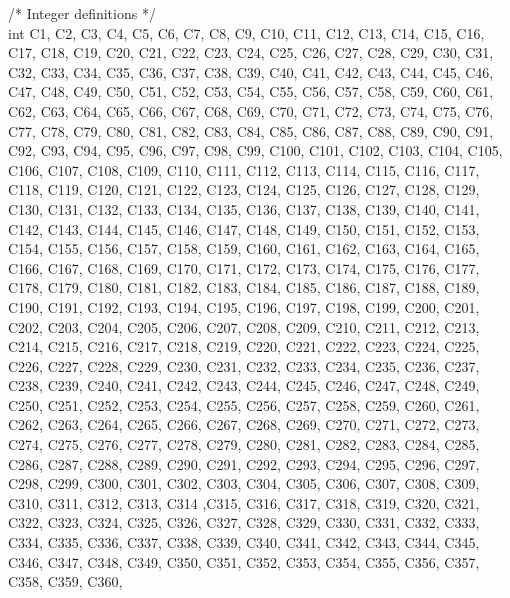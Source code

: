 /* Integer definitions */ \\
int C1, C2, C3, C4, C5, C6, C7, C8, C9, C10, C11, C12, C13, C14, C15, C16, C17, C18, C19, C20, C21, C22, C23, C24, C25, C26, C27, C28, C29, C30, C31, C32, C33, C34, C35, C36, C37, C38, C39, C40, C41, C42, C43, C44, C45, C46, C47, C48, C49, C50, C51, C52, C53, C54, C55, C56, C57, C58, C59, C60, C61, C62, C63, C64, C65, C66, C67, C68, C69, C70, C71, C72, C73, C74, C75, C76, C77, C78, C79, C80, C81, C82, C83, C84, C85, C86, C87, C88, C89, C90, C91, C92, C93, C94, C95, C96, C97, C98, C99, C100, C101, C102, C103, C104, C105, C106, C107, C108, C109, C110, C111, C112, C113, C114, C115, C116, C117, C118, C119, C120, C121, C122, C123, C124, C125, C126, C127, C128, C129, C130, C131, C132, C133, C134, C135, C136, C137, C138, C139, C140, C141, C142, C143, C144, C145, C146, C147, C148, C149, C150, C151, C152, C153, C154, C155, C156, C157, C158, C159, C160, C161, C162, C163, C164, C165, C166, C167, C168, C169, C170, C171, C172, C173, C174, C175, C176, C177, C178, C179, C180, C181, C182, C183, C184, C185, C186, C187, C188, C189, C190, C191, C192, C193, C194, C195, C196, C197, C198, C199, C200, C201, C202, C203, C204, C205, C206, C207, C208, C209, C210, C211, C212, C213, C214, C215, C216, C217, C218, C219, C220, C221, C222, C223, C224, C225, C226, C227, C228, C229, C230, C231, C232, C233, C234, C235, C236, C237, C238, C239, C240, C241, C242, C243, C244, C245, C246, C247, C248, C249, C250, C251, C252, C253, C254, C255, C256, C257, C258, C259, C260, C261, C262, C263, C264, C265, C266, C267, C268, C269, C270, C271, C272, C273, C274, C275, C276, C277, C278, C279, C280, C281, C282, C283, C284, C285, C286, C287, C288, C289, C290, C291, C292, C293, C294, C295, C296, C297, C298, C299, C300, C301, C302, C303, C304, C305, C306, C307, C308, C309, C310, C311, C312, C313, C314 ,C315, C316, C317, C318, C319, C320, C321, C322,
C323, C324, C325, C326, C327, C328, C329, C330, C331, C332, C333, C334, C335, C336, C337, C338, C339, C340, C341,
C342, C343, C344, C345, C346, C347, C348, C349, C350, C351, C352, C353, C354, C355, C356, C357, C358, C359, C360,
